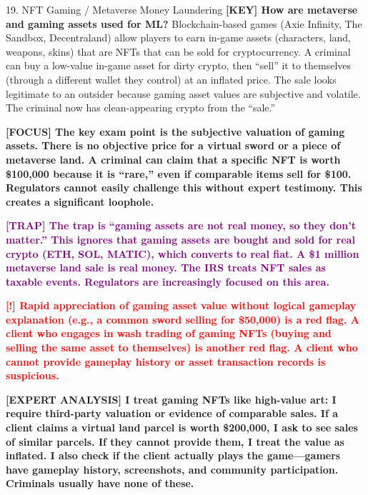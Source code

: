 \documentclass[11pt,a4paper]{beamer}
\newcommand{\redflag}[1]{\textcolor{red}{\textbf{[!] #1}}}
\newcommand{\examfocus}[1]{\textcolor{orange!80!black}{\textbf{[FOCUS] #1}}}
\newcommand{\trap}[1]{\textcolor{purple}{\textbf{[TRAP] #1}}}
\newcommand{\keyterm}[1]{\textcolor{red!80!black}{\textbf{[KEY] #1}}}
\newcommand{\expert}[1]{\textcolor{blue!70!black}{\textbf{[EXPERT ANALYSIS] #1}}}
\begin{document}
	\begin{frame}{19. NFT Gaming / Metaverse Money Laundering}
		\tiny
		\keyterm{How are metaverse and gaming assets used for ML?} Blockchain-based games (Axie Infinity, The Sandbox, Decentraland) allow players to earn in-game assets (characters, land, weapons, skins) that are NFTs that can be sold for cryptocurrency. A criminal can buy a low-value in-game asset for dirty crypto, then “sell” it to themselves (through a different wallet they control) at an inflated price. The sale looks legitimate to an outsider because gaming asset values are subjective and volatile. The criminal now has clean-appearing crypto from the “sale.”
		
		\vspace{0.1cm}
		\examfocus{The key exam point is the subjective valuation of gaming assets. There is no objective price for a virtual sword or a piece of metaverse land. A criminal can claim that a specific NFT is worth \$100,000 because it is “rare,” even if comparable items sell for \$100. Regulators cannot easily challenge this without expert testimony. This creates a significant loophole.}
		
		\vspace{0.1cm}
		\trap{The trap is “gaming assets are not real money, so they don't matter.” This ignores that gaming assets are bought and sold for real crypto (ETH, SOL, MATIC), which converts to real fiat. A \$1 million metaverse land sale is real money. The IRS treats NFT sales as taxable events. Regulators are increasingly focused on this area.}
		
		\vspace{0.1cm}
		\redflag{Rapid appreciation of gaming asset value without logical gameplay explanation (e.g., a common sword selling for \$50,000) is a red flag. A client who engages in wash trading of gaming NFTs (buying and selling the same asset to themselves) is another red flag. A client who cannot provide gameplay history or asset transaction records is suspicious.}
		
		\vspace{0.1cm}
		\expert{I treat gaming NFTs like high-value art: I require third-party valuation or evidence of comparable sales. If a client claims a virtual land parcel is worth \$200,000, I ask to see sales of similar parcels. If they cannot provide them, I treat the value as inflated. I also check if the client actually plays the game—gamers have gameplay history, screenshots, and community participation. Criminals usually have none of these.}
	\end{frame}
	
\end{document}
